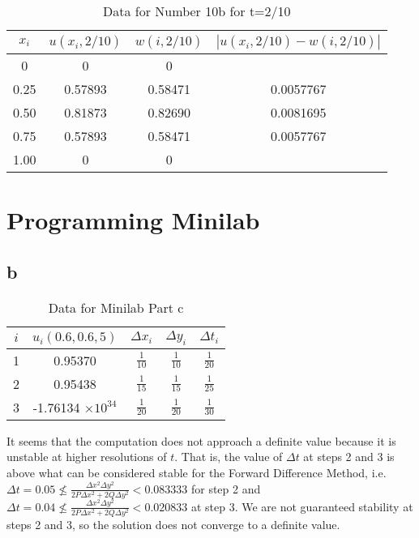 \documentclass[12pt]{article}
\begin{document}
\begin{table}[H]
  \centering
  \begin{tabular}[p]{cccc}
    \hline
    $x_i$ & $u(x_i,2/10)$ & $w(i,2/10)$ & $|u(x_i,2/10)-w(i,2/10)|$ \\
    \hline
    0 & 0 & 0 & \\
    0.25 & 0.57893 & 0.58471 & 0.0057767 \\
    0.50 & 0.81873 & 0.82690 & 0.0081695 \\
    0.75 & 0.57893 & 0.58471 & 0.0057767 \\
    1.00 & 0 & 0 & \\
    \hline
  \end{tabular}
  \caption{Data for Number 10b for t=2/10}
  \label{tab:10b_2}
\end{table}

\section{Programming Minilab}
\subsection{b}
\begin{table}[H]
  \centering
  \begin{tabular}[H]{ccccc}
    \hline
    $i$ & $u_i(0.6, 0.6, 5)$ & $\Delta x_i$ & $\Delta y_i$ & $\Delta t_i$ \\
    \hline
    1 & 0.95370 & $\frac{1}{10}$ & $\frac{1}{10}$ & $\frac{1}{20}$ \\ 
    2 & 0.95438 & $\frac{1}{15}$ & $\frac{1}{15}$ & $\frac{1}{25}$ \\
    3 & -1.76134 $\times 10^{34}$ & $\frac{1}{20}$ & $\frac{1}{20}$ &
    $\frac{1}{30}$ \\
    \hline
  \end{tabular}
  \caption{Data for Minilab Part c}
  \label{tab:mini_b}
\end{table}

It seems that the computation does not approach a definite value
because it is unstable at higher resolutions of $t$. That is, the
value of $\Delta t$ at steps 2 and 3 is above what can be considered
stable for the Forward Difference Method, i.e. $\Delta t = 0.05 \not\leq
\frac{\Delta x^2\Delta y^2}{2P\Delta x^2 + 2Q\Delta y^2} < 0.083333$
for step 2 and $\Delta t = 0.04 \not\leq \frac{\Delta x^2\Delta y^2}{2P\Delta
  x^2 + 2Q\Delta y^2}<0.020833$ at step 3. We are not guaranteed
stability at steps 2 and 3, so the solution does not converge to a
definite value.
\end{document}

